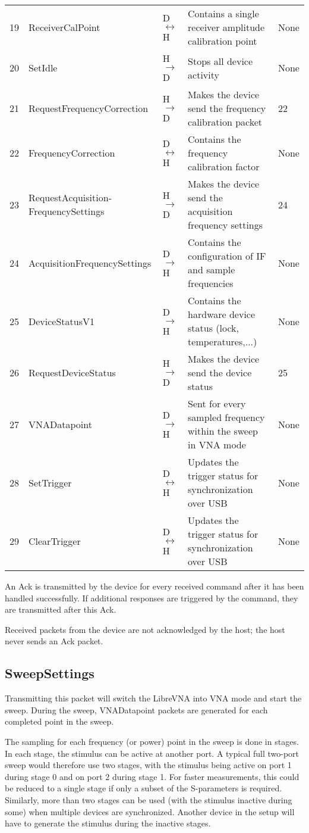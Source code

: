 \documentclass[a4paper,11pt]{article}
\begin{document}
\begin{ThreePartTable}
\begin{longtable}{p{} |  p{} | p{} | p{} |p{} }
19 & ReceiverCalPoint & D$\leftrightarrow$H & Contains a single receiver amplitude calibration point &None \\
20 & SetIdle & H$\rightarrow$D & Stops all device activity & None \\
21 & RequestFrequencyCorrection & H$\rightarrow$D & Makes the device send the frequency calibration packet &22 \\
22 & FrequencyCorrection & D$\leftrightarrow$H & Contains the frequency calibration factor & None\\
23 & RequestAcquisition-FrequencySettings & H$\rightarrow$D & Makes the device send the acquisition frequency settings & 24\\
24 & AcquisitionFrequencySettings & D$\rightarrow$H & Contains the configuration of IF and sample frequencies &None \\
25 & DeviceStatusV1 & D$\rightarrow$H & Contains the hardware device status (lock, temperatures,...) &None \\
26 & RequestDeviceStatus & H$\rightarrow$D & Makes the device send the device status &25 \\
27 & VNADatapoint & D$\rightarrow$H & Sent for every sampled frequency within the sweep in VNA mode &None \\
28 & SetTrigger & D$\leftrightarrow$H & Updates the trigger status for synchronization over USB & None\\
29 & ClearTrigger & D$\leftrightarrow$H & Updates the trigger status for synchronization over USB & None\\
\end{longtable}   
\end{ThreePartTable}
An Ack is transmitted by the device for every received command after it has been handled successfully. If additional responses are triggered by the command, they are transmitted after this Ack.

Received packets from the device are not acknowledged by the host; the host never sends an Ack packet.

\subsection{SweepSettings}
Transmitting this packet will switch the LibreVNA into VNA mode and start the sweep. During the sweep, VNADatapoint packets are generated for each completed point in the sweep.

The sampling for each frequency (or power) point in the sweep is done in stages. In each stage, the stimulus can be active at another port. A typical full two-port sweep would therefore use two stages, with the stimulus being active on port 1 during stage 0 and on port 2 during stage 1. For faster measurements, this could be reduced to a single stage if only a subset of the S-parameters is required. Similarly, more than two stages can be used (with the stimulus inactive during some) when multiple devices are synchronized. Another device in the setup will have to generate the stimulus during the inactive stages.
\end{document}
